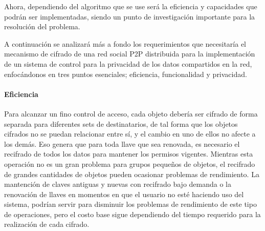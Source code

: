     Ahora, dependiendo del algoritmo que se use será la eficiencia y
    capacidades que podrán ser implementadas, siendo un punto de investigación
    importante para la resolución del problema.

     A continuación se analizará más a fondo los requerimientos que necesitaría el
    mecanismo de cifrado de una red social P2P distribuida para la
    implementación de un sistema de control para la privacidad de los datos
    compartidos en la red, enfocándonos en tres puntos esenciales; eficiencia,
    funcionalidad y privacidad.

    \paragraph{Eficiencia}
    
    Para alcanzar un fino control de acceso, cada objeto debería ser
    cifrado de forma separada para diferentes sets de destinatarios, de tal
    forma que los objetos cifrados no se puedan relacionar entre sí, y el cambio
    en uno de ellos no afecte a los demás. Eso genera que para toda llave que sea
    renovada, es necesario el recifrado de todos los datos para mantener los
    permisos vigentes. Mientras esta operación no es un gran problema para
    grupos pequeños de objetos, el recifrado de grandes cantidades de objetos
    pueden ocasionar problemas de rendimiento.
    La mantención de claves antiguas y nuevas con recifrado bajo demanda o la
    renovación de llaves en momentos en que el usuario no esté haciendo uso del
    sistema, podrían servir para disminuir los problemas de rendimiento de este
    tipo de operaciones, pero el costo base sigue dependiendo del tiempo
    requerido para la realización de cada cifrado.

